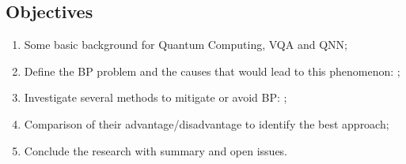 \subsection{Objectives}

\begin{enumerate}
    \item Some basic background for Quantum Computing, VQA and QNN;
    \item Define the BP problem and the causes that would lead to this phenomenon: \cite{wangNoiseinducedBarrenPlateaus2021,zhaoAnalyzingBarrenPlateau2021};
    \item Investigate several methods to mitigate or avoid BP: \cite{pesahAbsenceBarrenPlateaus2021, pattiEntanglementDevisedBarren2021,liuParameterInitializationMethod2021};
    \item Comparison of their advantage/disadvantage to identify the best approach;
    \item Conclude the research with summary and open issues.
\end{enumerate}